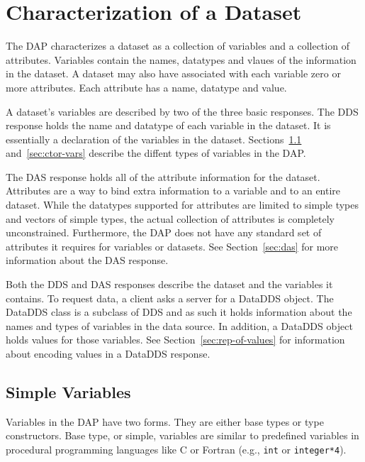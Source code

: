 \documentclass{article}
\begin{document}
\section{Characterization of a Dataset}

The \ac{DAP} characterizes a dataset as a collection of variables and a
collection of attributes. Variables contain the names, datatypes and vlaues
of the information in the dataset. A dataset may also have associated with
each variable zero or more attributes. Each attribute has a name, datatype
and value. 

A dataset's variables are described by two of the three basic responses. The
\ac{DDS} response holds the name and datatype of each variable in the
dataset. It is essentially a declaration of the variables in the dataset.
Sections~\ref{simple-variables} and~\ref{sec:ctor-vars} describe the diffent
types of variables in the \ac{DAP}. 

The \ac{DAS} response holds all of the attribute information for the dataset.
Attributes are a way to bind extra information to a variable and to an entire
dataset. While the datatypes supported for attributes are limited to simple
types and vectors of simple types, the actual collection of attributes is
completely unconstrained. Furthermore, the \ac{DAP} does not have any
standard set of attributes it requires for variables or datasets. See
Section~\ref{sec:das} for more information about the \ac{DAS} response.

Both the \ac{DDS} and \ac{DAS} responses describe the dataset and the
variables it contains. To request data, a client asks a server for a
\ac{DataDDS} object. The \ac{DataDDS} class is a subclass of \ac{DDS} and as
such it holds information about the names and types of variables in the data
source. In addition, a \ac{DataDDS} object holds values for those variables.
See Section~\ref{sec:rep-of-values} for information about encoding values in
a \ac{DataDDS} response.

\subsection{Simple Variables}
\label{simple-variables}

Variables in the \ac{DAP} have two forms. They are either base types or type
constructors. Base type, or simple, variables are similar to predefined
variables in procedural programming languages like C or Fortran (e.g.,
\texttt{int} or \texttt{integer*4}).
\end{document}
